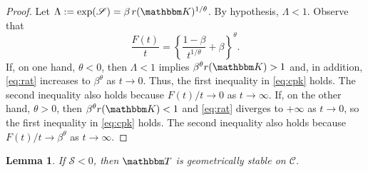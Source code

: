 \documentclass[12pt, reqno]{amsart}
\newcommand{\1}{\mathbbm 1}
\newcommand{\cC}{\mathscr C}
\newcommand{\sS}{\mathscr S}
\newcommand{\KK}{\mathbbm K}
\newcommand{\TT}{\mathbbm T}
\theoremstyle{plain}
\newtheorem{lemma}[theorem]{Lemma}
\theoremstyle{definition}
\begin{document}
\begin{proof}
    Let $\Lambda := \exp(\sS) = \beta \, r(\KK)^{1/\theta}$.  By hypothesis,
    $\Lambda < 1$.  Observe that
    \begin{equation}
        \label{eq:rat}
        \frac{F(t)}{t}
        = \left\{ \frac{1 - \beta}{t^{1/\theta}} + \beta \right\}^\theta .
    \end{equation}
    If, on one hand, $\theta < 0$, then $\Lambda < 1$ implies $\beta^\theta
    r(\KK) > 1$ and, in addition, \eqref{eq:rat}
    increases to $\beta^{\theta}$ as $t \to 0$.  Thus, the first inequality in
    \eqref{eq:cpk} holds.  The second inequality also holds because $F(t)/t
    \to 0$ as $t \to \infty$.  If, on the other hand, $\theta > 0$, then
    $\beta^\theta r(\KK)
    < 1$ and  \eqref{eq:rat} diverges to $+\infty$ as $t \to 0$, so the first
    inequality in \eqref{eq:cpk} holds.  The second inequality also holds
    because $F(t)/t \to \beta^\theta$ as $t \to \infty$.
\end{proof}


\begin{lemma}\label{l:llo}
    If $\sS < 0$, then $\TT$ is geometrically stable on $\cC$.  
\end{lemma}
\end{document}
